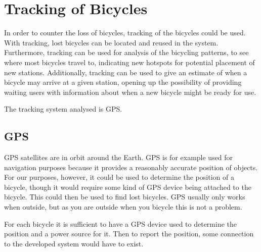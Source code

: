 \section{Tracking of Bicycles}
In order to counter the loss of bicycles, tracking of the bicycles could be used.
With tracking, lost bicycles can be located and reused in the system.
Furthermore, tracking can be used for analysis of the bicycling patterns, to see where most bicycles travel to, indicating new hotspots for potential placement of new stations.
Additionally, tracking can be used to give an estimate of when a bicycle may arrive at a given station, opening up the possibility of providing waiting users with information about when a new bicycle might be ready for use.

The tracking system analysed is GPS.

\subsection{GPS}
GPS satellites are in orbit around the Earth.
GPS is for example used for navigation purposes because it provides a reasonably accurate position of objects.
For our purposes, however, it could be used to determine the position of a bicycle, though it would require some kind of GPS device being attached to the bicycle.
This could then be used to find lost bicycles.
GPS usually only works when outside, but as you are outside when you bicycle this is not a problem\citep{misc:howgpsworks}.

For each bicycle it is sufficient to have a GPS device used to determine the position and a power source for it.
Then to report the position, some connection to the developed system would have to exist.

